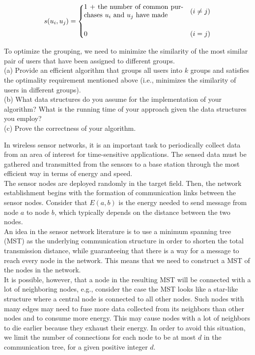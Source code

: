 \documentclass{article}
\begin{document}
$$
s(u_i, u_j) = \begin{cases}
  \parbox{2in}{1 + the number of common purchases $u_i$ and $u_j$ have made} & 
  (i \neq j) \\
    \\
  0 & (i = j)
\end{cases}
$$

\noindent To optimize the grouping, we need to minimize the similarity
of the most similar pair of users that have been assigned to different
groups.\\

\noindent (a) Provide an efficient algorithm that groups all users
into $k$ groups and satisfies the optimality requirement mentioned
above (i.e., minimizes the similarity of users in different groups).\\

\noindent (b) What data structures do you assume for the
implementation of your algorithm?  What is the running time of your
approach given the data structures you employ?\\

\noindent (c) Prove the correctness of your algorithm.\\
\vspace{0.2in}

 In wireless sensor networks, it
is an important task to periodically collect data from an area of
interest for time-sensitive applications. The sensed data must be
gathered and transmitted from the sensors to a base station through
the most efficient way in terms of energy and speed.\\

\noindent The sensor nodes are deployed randomly in the target
field. Then, the network establishment begins with the formation of
communication links between the sensor nodes. Consider that $E(a,b)$
is the energy needed to send message from node $a$ to node $b$, which
typically depends on the distance between the two nodes.\\

\noindent An idea in the sensor network literature is to use a minimum
spanning tree (MST) as the underlying communication structure in order
to shorten the total transmission distance, while guaranteeing that
there is a way for a message to reach every node in the network. This
means that we need to construct a MST of the nodes in the network.\\

\noindent It is possible, however, that a node in the resulting MST
will be connected with a lot of neighboring nodes, e.g., consider the
case the MST looks like a star-like structure where a central node is
connected to all other nodes. Such nodes with many edges may need to
fuse more data collected from its neighbors than other nodes and to
consume more energy.  This may cause nodes with a lot of neighbors to
die earlier because they exhaust their energy.  In order to avoid this
situation, we limit the number of connections for each node to be at
most $d$ in the communication tree, for a given positive integer
$d$.\\
\end{document}
